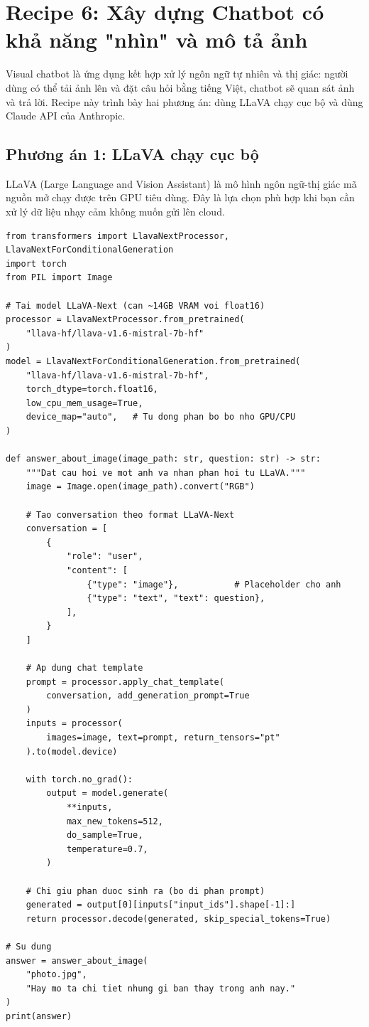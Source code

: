 \section{Recipe 6: Xây dựng Chatbot có khả năng "nhìn" và mô tả ảnh}
\label{sec:recipe_visual_chatbot}

Visual chatbot là ứng dụng kết hợp xử lý ngôn ngữ tự nhiên và thị giác: người dùng có thể tải ảnh lên và đặt câu hỏi bằng tiếng Việt, chatbot sẽ quan sát ảnh và trả lời. Recipe này trình bày hai phương án: dùng LLaVA chạy cục bộ và dùng Claude API của Anthropic.

\subsection{Phương án 1: LLaVA chạy cục bộ}
\label{subsec:vchat_llava}

LLaVA (Large Language and Vision Assistant) là mô hình ngôn ngữ-thị giác mã nguồn mở chạy được trên GPU tiêu dùng. Đây là lựa chọn phù hợp khi bạn cần xử lý dữ liệu nhạy cảm không muốn gửi lên cloud.

\begin{verbatim}
from transformers import LlavaNextProcessor, LlavaNextForConditionalGeneration
import torch
from PIL import Image

# Tai model LLaVA-Next (can ~14GB VRAM voi float16)
processor = LlavaNextProcessor.from_pretrained(
    "llava-hf/llava-v1.6-mistral-7b-hf"
)
model = LlavaNextForConditionalGeneration.from_pretrained(
    "llava-hf/llava-v1.6-mistral-7b-hf",
    torch_dtype=torch.float16,
    low_cpu_mem_usage=True,
    device_map="auto",   # Tu dong phan bo bo nho GPU/CPU
)

def answer_about_image(image_path: str, question: str) -> str:
    """Dat cau hoi ve mot anh va nhan phan hoi tu LLaVA."""
    image = Image.open(image_path).convert("RGB")

    # Tao conversation theo format LLaVA-Next
    conversation = [
        {
            "role": "user",
            "content": [
                {"type": "image"},           # Placeholder cho anh
                {"type": "text", "text": question},
            ],
        }
    ]

    # Ap dung chat template
    prompt = processor.apply_chat_template(
        conversation, add_generation_prompt=True
    )
    inputs = processor(
        images=image, text=prompt, return_tensors="pt"
    ).to(model.device)

    with torch.no_grad():
        output = model.generate(
            **inputs,
            max_new_tokens=512,
            do_sample=True,
            temperature=0.7,
        )

    # Chi giu phan duoc sinh ra (bo di phan prompt)
    generated = output[0][inputs["input_ids"].shape[-1]:]
    return processor.decode(generated, skip_special_tokens=True)

# Su dung
answer = answer_about_image(
    "photo.jpg",
    "Hay mo ta chi tiet nhung gi ban thay trong anh nay."
)
print(answer)
\end{verbatim}

